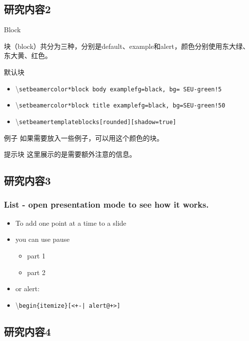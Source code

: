 \documentclass[10pt,aspectratio=169]{beamer}
\begin{document}
\subsection{研究内容2}
\begin{frame}{Block}
	
块（block）共分为三种，分别是default、example和alert，颜色分别使用东大绿、东大黄、红色。

\begin{block}{默认块}
	  \begin{itemize}
  \item \textbackslash \texttt{setbeamercolor*{block body example}{fg=black, bg= SEU-green!5}}
\item \textbackslash \texttt{setbeamercolor*{block title example}{fg=black, bg=SEU-green!50}}
\item \textbackslash \texttt{setbeamertemplate{blocks}[rounded][shadow=true]}
  \end{itemize}
\end{block}

\begin{exampleblock}{例子}
	如果需要放入一些例子，可以用这个颜色的块。
\end{exampleblock}

\begin{alertblock}{提示块}
	这里展示的是需要额外注意的信息。
\end{alertblock}
\end{frame}
\subsection{研究内容3}
\begin{frame}
	\frametitle{List - open presentation mode to see how it works.}
	\begin{itemize}%
		\pause
		\item To add one point at a time to a slide
		\pause
		\item you can use pause
		\begin{itemize}
			\pause
			\item part 1
			\pause
			\item part 2
		\end{itemize}
		\pause
		\item or alert:
		\pause
		\item \textbackslash\texttt{begin\{itemize\}[<+-| alert@+>]}
	\end{itemize}
\end{frame}
\subsection{研究内容4}
\end{document}
